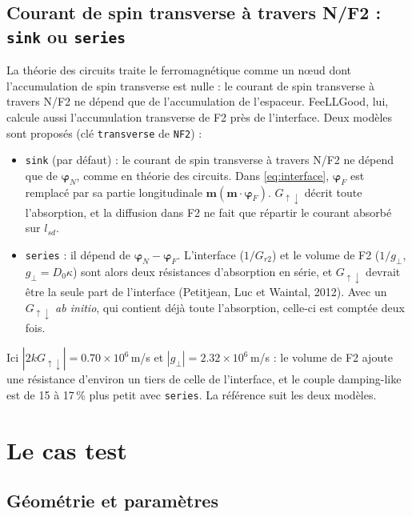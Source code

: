 \documentclass[11pt,a4paper]{article}
\newcommand{\vm}{\bm{m}}
\newcommand{\vphi}{\bm{\varphi}}
\begin{document}
\subsection{Courant de spin transverse à travers N/F2 : \texttt{sink} ou \texttt{series}}

La théorie des circuits traite le ferromagnétique comme un nœud dont
l'accumulation de spin transverse est nulle : le courant de spin
transverse à travers N/F2 ne dépend que de l'accumulation de l'espaceur.
FeeLLGood, lui, calcule aussi l'accumulation transverse de F2 près de
l'interface. Deux modèles sont proposés (clé \texttt{transverse} de
\texttt{NF2}) :
\begin{itemize}
  \item \texttt{sink} (par défaut) : le courant de spin transverse à
    travers N/F2 ne dépend que de $\vphi_N$, comme en théorie des
    circuits. Dans \eqref{eq:interface}, $\vphi_F$ est remplacé par sa
    partie longitudinale $\vm(\vm\cdot\vphi_F)$. $G_{\uparrow\downarrow}$
    décrit toute l'absorption, et la diffusion dans F2 ne fait que répartir
    le courant absorbé sur $l_{sd}$.
  \item \texttt{series} : il dépend de $\vphi_N - \vphi_F$. L'interface
    ($1/G_{r2}$) et le volume de F2 ($1/g_\perp$, $g_\perp = D_0\kappa$)
    sont alors deux résistances d'absorption en série, et
    $G_{\uparrow\downarrow}$ devrait être la seule part de l'interface
    (Petitjean, Luc et Waintal, 2012). Avec un $G_{\uparrow\downarrow}$
    \emph{ab initio}, qui contient déjà toute l'absorption, celle-ci est
    comptée deux fois.
\end{itemize}
Ici $|2kG_{\uparrow\downarrow}| = 0.70\times10^6$\,m/s et $|g_\perp| =
2.32\times10^6$\,m/s : le volume de F2 ajoute une résistance d'environ un
tiers de celle de l'interface, et le couple damping-like est de 15 à
17\,\% plus petit avec \texttt{series}. La référence suit les deux
modèles.

\section{Le cas test}

\subsection{Géométrie et paramètres}
\end{document}
